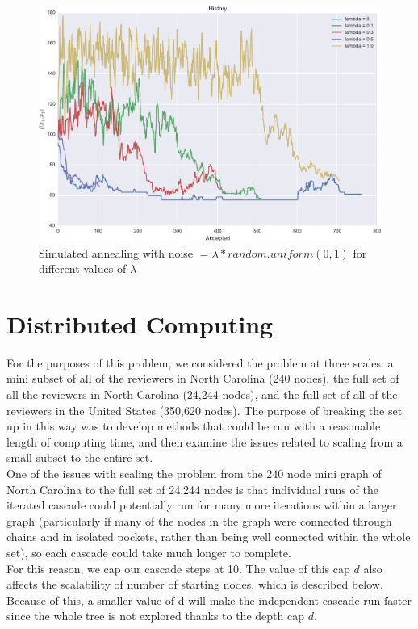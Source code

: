 \documentclass[11pt]{scrartcl} %
\begin{document}
\begin{figure}
\centering
\includegraphics[width=10 cm]{lambda01}
\caption{Simulated annealing with noise $= \lambda*random.uniform(0,1)$ for different values of $\lambda$}
\label{fig:SA}
\end{figure}
	 
\section{Distributed Computing}

For the purposes of this problem, we considered the problem at three scales: a mini subset of all of the reviewers in North Carolina (240 nodes), the full set of all the reviewers in North Carolina (24,244 nodes), and the full set of all of the reviewers in the United States (350,620 nodes).  The purpose of breaking the set up in this way was to develop methods that could be run with a reasonable length of computing time, and then examine the issues related to scaling from a small subset to the entire set.  \\

One of the issues with scaling the problem from the 240 node mini graph of North Carolina to the full set of 24,244 nodes is that individual runs of the iterated cascade could potentially run for many more iterations within a larger graph (particularly if many of the nodes in the graph were connected through chains and in isolated pockets, rather than being well connected within the whole set), so each cascade could take much longer to complete.  \\

For this reason, we cap our cascade steps at 10.  The value of this cap $d$ also affects the scalability of number of starting nodes, which is described below.  Because of this, a smaller value of d will make the independent cascade run faster since the whole tree is not explored thanks to the depth cap $d$. \\
\end{document}
